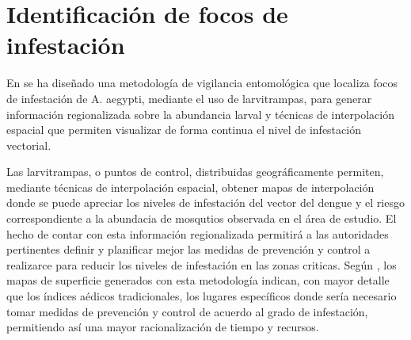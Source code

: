 \section{Identificación de focos de infestación}
\label{sec:cap4-identificacion-focos}

En \citet{NINO2011} se ha diseñado una metodología de vigilancia entomológica que localiza focos
de infestación de A. aegypti, mediante el uso de larvitrampas, para generar información
regionalizada sobre la abundancia larval y técnicas de interpolación espacial que permiten
visualizar de forma continua el nivel de infestación vectorial.

Las larvitrampas, o puntos de control, distribuidas geográficamente permiten, mediante técnicas de
interpolación espacial, obtener mapas de interpolación donde se puede apreciar los niveles de
infestación del vector del dengue y el riesgo correspondiente a la abundacia de mosqutios
observada en el área de estudio. El hecho de contar con esta información regionalizada permitirá
a las autoridades pertinentes definir y planificar mejor las medidas de prevención y control a
realizarce para reducir los niveles de infestación en las zonas criticas. Según \citet{NINO2011},
los mapas de superficie generados con esta metodología indican, con mayor detalle que los índices
aédicos tradicionales, los lugares específicos donde sería necesario tomar medidas de prevención y
control de acuerdo al grado de infestación, permitiendo así una mayor racionalización de tiempo y
recursos.
